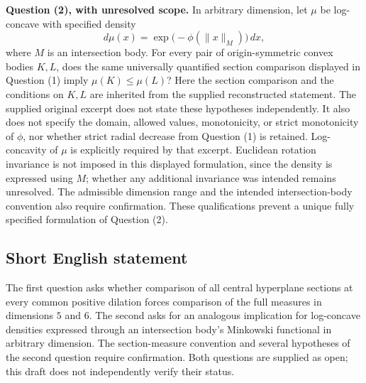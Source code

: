 \documentclass[11pt]{article}
\begin{document}
\textbf{Question (2), with unresolved scope.} In arbitrary dimension, let \(\mu\) be log-concave with specified density
\[
d\mu(x)=\exp\bigl(-\phi(\|x\|_M)\bigr)\,dx,
\]
where \(M\) is an intersection body. For every pair of origin-symmetric convex bodies \(K,L\), does the same universally quantified section comparison displayed in Question (1) imply \(\mu(K)\leq\mu(L)\)? Here the section comparison and the conditions on \(K,L\) are inherited from the supplied reconstructed statement. The supplied original excerpt does not state these hypotheses independently. It also does not specify the domain, allowed values, monotonicity, or strict monotonicity of \(\phi\), nor whether strict radial decrease from Question (1) is retained. Log-concavity of \(\mu\) is explicitly required by that excerpt. Euclidean rotation invariance is not imposed in this displayed formulation, since the density is expressed using \(M\); whether any additional invariance was intended remains unresolved. The admissible dimension range and the intended intersection-body convention also require confirmation. These qualifications prevent a unique fully specified formulation of Question (2).
\subsection{Short English statement}
The first question asks whether comparison of all central hyperplane sections at every common positive dilation forces comparison of the full measures in dimensions \(5\) and \(6\). The second asks for an analogous implication for log-concave densities expressed through an intersection body's Minkowski functional in arbitrary dimension. The section-measure convention and several hypotheses of the second question require confirmation. Both questions are supplied as open; this draft does not independently verify their status.
\end{document}

